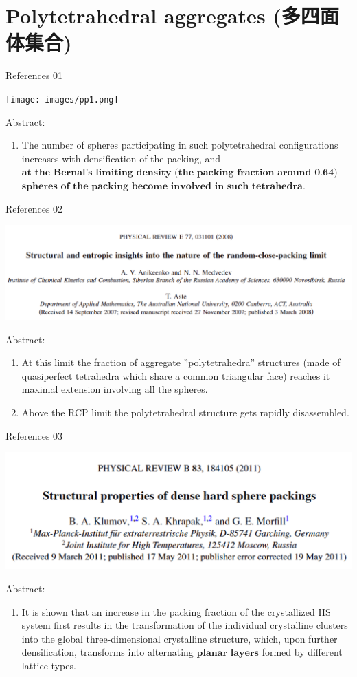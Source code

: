 \documentclass{bredelebeamer}
\begin{document}
\section{Polytetrahedral aggregates (多四面体集合)}
\begin{frame}{References 01}
\centerline{\texttt{[image: images/pp1.png]}}
Abstract:
\begin{enumerate}[]
\item The number of spheres participating in
such polytetrahedral configurations increases with densification of the packing, and $\textbf{at the Bernal's limiting density (the packing fraction around 0.64) all}$ $\textbf{spheres of the packing become involved in such tetrahedra}$.
\end{enumerate}
\end{frame}

\begin{frame}{References 02}
\centerline{\includegraphics[scale=0.2]{images/pp2.png}}
Abstract:
\begin{enumerate}[]
\item At this limit the fraction of aggregate ''polytetrahedra'' structures (made of quasiperfect tetrahedra which share a common triangular face) reaches it maximal extension involving all the spheres.
\item Above the RCP limit the polytetrahedral structure gets rapidly disassembled.
\end{enumerate}
\end{frame}

\begin{frame}{References 03}
\centerline{\includegraphics[scale=0.2]{images/pp3.png}}
Abstract:
\begin{enumerate}[]
\item It is shown that an increase in the packing fraction of the
crystallized HS system first results in the transformation of the individual crystalline clusters into the global
three-dimensional crystalline structure, which, upon further densification, transforms into alternating $\textbf{planar layers}$ formed by different lattice types.
\end{enumerate}
\end{frame}
\end{document}
